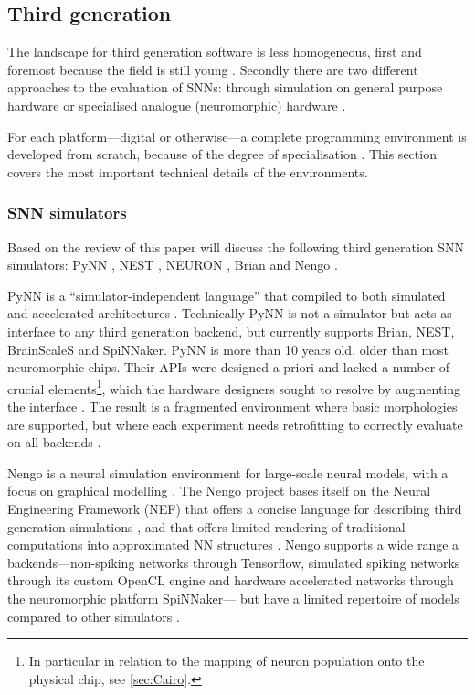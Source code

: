 \documentclass[report.tex]{subfiles}
\begin{document}
\subsection{Third generation}
The landscape for third generation software is less homogeneous, first and
foremost because the field is still young \cite{Maass1997}.
Secondly there are two different approaches to the evaluation of \gls{SNN}s:
through simulation on general purpose hardware or specialised analogue
(neuromorphic) hardware \cite{Maass1997, Davison2009, Albada2018}.

For each platform---digital or otherwise---a complete programming environment
is developed from scratch, because of the degree of specialisation
\cite{Walter2015, Lin2018}.
This section covers the most important technical details of
the environments.

\subsubsection{\Gls{SNN} simulators}
Based on the review of \textcite{Blundell2018} this paper will discuss
the following third generation \gls{SNN} simulators: PyNN \cite{Davison2009},
NEST \cite{Gewaltig2007}, NEURON \cite{Carnevale2007},
Brian \cite{Goodman2013} and Nengo \cite{Eliasmith2015}.

PyNN is a ``simulator-independent language''
\cite{PyNN2018} that compiled to both simulated and
accelerated architectures \cite{Davison2009}.
Technically PyNN is not a simulator but acts as interface to any third generation
backend, but currently supports Brian, NEST, BrainScaleS and SpiNNaker.
PyNN is more than 10 years old, \cite{Davison2009} older
than most neuromorphic chips. 
Their \gls{API}s were designed a priori and lacked a number of crucial
elements\footnote{In particular in relation to the mapping of neuron population
onto the physical chip, see \ref{sec:Cairo}.}, which the hardware designers sought
to resolve by augmenting the interface \cite{Pfeil2013, PyNN2018}.
The result is a fragmented environment where basic morphologies are supported, 
but where each experiment needs retrofitting to correctly evaluate on all
backends \cite{PyNN2018}.

Nengo is a neural simulation environment for large-scale neural models, with
a focus on graphical modelling \cite{Eliasmith2015}. 
The Nengo project bases itself on the Neural Engineering Framework (NEF)
 that offers a concise language for
describing third generation simulations \cite{Bekolay2014}, and that
offers limited rendering of traditional computations into approximated
\gls{NN} structures \cite{Eliasmith2004, Eliasmith2015}.
Nengo supports a wide range a backends---non-spiking networks through Tensorflow,
simulated spiking networks through its custom \gls{OpenCL} engine and 
hardware accelerated networks through the neuromorphic platform SpiNNaker---
but have a limited repertoire of models compared to other simulators
\cite{Nengo2018}.
\end{document}
